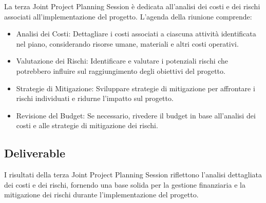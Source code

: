 La terza Joint Project Planning Session è dedicata all'analisi dei costi e dei rischi associati all'implementazione del progetto. L'agenda della riunione comprende:

\begin{itemize}
    \item Analisi dei Costi: Dettagliare i costi associati a ciascuna attività identificata nel piano, considerando risorse umane, materiali e altri costi operativi.
    \item Valutazione dei Rischi: Identificare e valutare i potenziali rischi che potrebbero influire sul raggiungimento degli obiettivi del progetto.
    \item Strategie di Mitigazione: Sviluppare strategie di mitigazione per affrontare i rischi individuati e ridurne l'impatto sul progetto.
    \item Revisione del Budget: Se necessario, rivedere il budget in base all'analisi dei costi e alle strategie di mitigazione dei rischi.
\end{itemize}

\subsection{Deliverable}

I risultati della terza Joint Project Planning Session riflettono l'analisi dettagliata dei costi e dei rischi, fornendo una base solida per la gestione finanziaria e la mitigazione dei rischi durante l'implementazione del progetto.